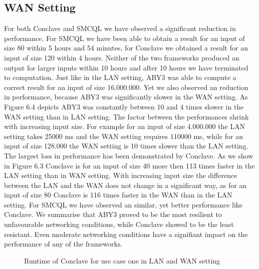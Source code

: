 \subsection{WAN Setting}
For both Conclave and SMCQL we have observed a significant reduction in performance. For SMCQL we have been able to obtain a result for an input of size 80 within 5 hours and 54 minutes, for Conclave we obtained a result for an input of size 120 within 4 hours. Neither of the two frameworks produced an output for larger inputs within 10 hours and after 10 hours we have terminated to computation. Just like in the LAN setting, ABY3 was able to compute a correct result for an input of size 16.000.000. Yet we also observed an reduction in performance, because ABY3 was significantly slower in the WAN setting. As Figure 6.4 depicts ABY3 was constantly between 10 and 4 times slower in the WAN setting than in LAN setting. The factor between the performances shrink with increasing input size.  For example for an input of size 4.000.000 the LAN setting takes 25000 ms and the WAN setting requires 110000 ms, while for an input of size 128.000 the WAN setting is 10 times slower than the LAN setting.
The largest loss in performance has been demonstrated by Conclave. As we show in Figure 6.3 Conclave is for an input of size 40 more then 113 times faster in the LAN setting than in WAN setting. With increasing input size the difference between the LAN and the WAN does not change in a significant way, as for an input of size 80 Conclave is 116 times faster in the WAN than in the LAN setting. For SMCQL we have observed an similar, yet better performance like Conclave. 
We summarise that ABY3 proved to be the most resilient to unfavourable networking conditions, while Conclave showed to be the least resistant. Even moderate networking conditions have a signifiant impact on the performance of any of the frameworks.


\begin{figure}[H]
	\caption{Runtime of Conclave for use case one in LAN and WAN setting}
\end{figure}

